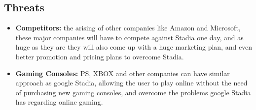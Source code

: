 \subsection{Threats}
\begin{itemize}    
    \item \textbf{Competitors:}
        the arising of other companies like Amazon and Microsoft, these major companies will have to compete against
        Stadia one day, and as huge as they are they will also come up with a huge marketing plan, and even better 
        promotion and pricing plans to overcome Stadia.

    \item \textbf{Gaming Consoles:}
        PS, XBOX and other companies can have similar   approach as google Stadia, allowing the user to play online 
        without the need of purchasing new gaming consoles, and overcome the problems google Stadia has regarding 
        online gaming.
\end{itemize}